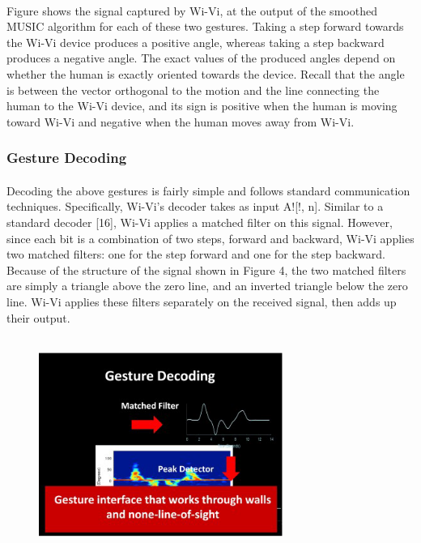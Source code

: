 \documentclass[a4paper,12pt,oneside]{article}
\begin{document}
\paragraph{}
Figure shows the signal captured by Wi-Vi, at the output of the smoothed MUSIC
algorithm for each of these two gestures. Taking a step forward towards the Wi-Vi device
produces a positive angle, whereas taking a step backward produces a negative angle. The exact
values of the produced angles depend on whether the human is exactly oriented towards the
device. Recall that the angle is between the vector orthogonal to the motion and the line
connecting the human to the Wi-Vi device, and its sign is positive when the human is moving
toward Wi-Vi and negative when the human moves away from Wi-Vi.

\subsubsection{Gesture Decoding}
\paragraph{}
Decoding the above gestures is fairly simple and follows standard communication
techniques. Specifically, Wi-Vi’s decoder takes as input A![!, n]. Similar to a standard decoder
[16], Wi-Vi applies a matched filter on this signal. However, since each bit is a combination of
two steps, forward and backward, Wi-Vi applies two matched filters: one for the step forward
and one for the step backward. Because of the structure of the signal shown in Figure 4, the two
matched filters are simply a triangle above the zero line, and an inverted triangle below the zero
line. Wi-Vi applies these filters separately on the received signal, then adds up their output.

\begin{figure}[H]
\centering
\includegraphics[height=7cm,width=8cm]{14.png}
\end{figure}
\end{document}
